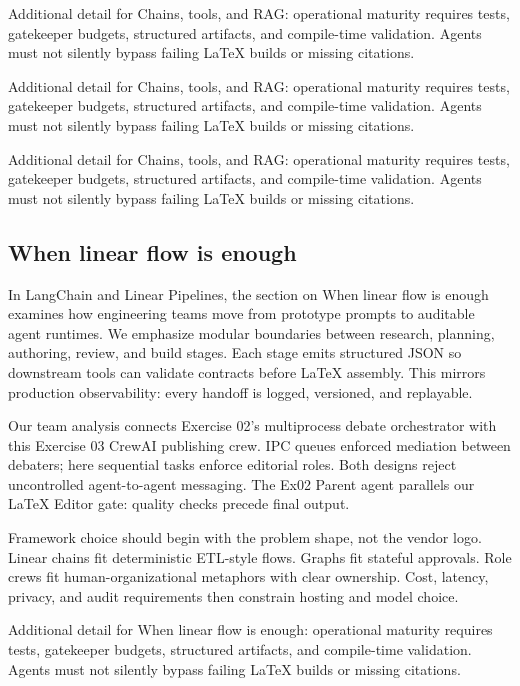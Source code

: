 Additional detail for Chains, tools, and RAG: operational maturity requires tests, gatekeeper budgets, structured artifacts, and compile-time validation. Agents must not silently bypass failing LaTeX builds or missing citations. \cite{crewai2024} \cite{langgraph2024}

Additional detail for Chains, tools, and RAG: operational maturity requires tests, gatekeeper budgets, structured artifacts, and compile-time validation. Agents must not silently bypass failing LaTeX builds or missing citations. \cite{crewai2024} \cite{langgraph2024}

Additional detail for Chains, tools, and RAG: operational maturity requires tests, gatekeeper budgets, structured artifacts, and compile-time validation. Agents must not silently bypass failing LaTeX builds or missing citations. \cite{crewai2024} \cite{langgraph2024}

\subsection{When linear flow is enough}
In LangChain and Linear Pipelines, the section on When linear flow is enough examines how engineering teams move from prototype prompts to auditable agent runtimes. We emphasize modular boundaries between research, planning, authoring, review, and build stages. Each stage emits structured JSON so downstream tools can validate contracts before LaTeX assembly. This mirrors production observability: every handoff is logged, versioned, and replayable. \cite{crewai2024} \cite{langgraph2024}

Our team analysis connects Exercise 02's multiprocess debate orchestrator with this Exercise 03 CrewAI publishing crew. IPC queues enforced mediation between debaters; here sequential tasks enforce editorial roles. Both designs reject uncontrolled agent-to-agent messaging. The Ex02 Parent agent parallels our LaTeX Editor gate: quality checks precede final output. \cite{crewai2024} \cite{langgraph2024}

Framework choice should begin with the problem shape, not the vendor logo. Linear chains fit deterministic ETL-style flows. Graphs fit stateful approvals. Role crews fit human-organizational metaphors with clear ownership. Cost, latency, privacy, and audit requirements then constrain hosting and model choice. \cite{crewai2024} \cite{langgraph2024}

Additional detail for When linear flow is enough: operational maturity requires tests, gatekeeper budgets, structured artifacts, and compile-time validation. Agents must not silently bypass failing LaTeX builds or missing citations. \cite{crewai2024} \cite{langgraph2024}

